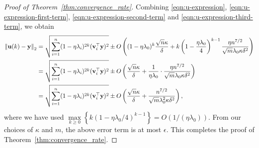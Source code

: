 \begin{proof}[Proof of Theorem~\ref{thm:convergence_rate}]
	Combining \eqref{eqn:u-expression}, \eqref{eqn:u-expression-first-term}, \eqref{eqn:u-expression-second-term} and \eqref{eqn:u-expression-third-term}, we obtain
	\begin{align*}
	\left\|\mathbf{u}(k) - \mathbf{y}\right\|_2
	&= \sqrt{\sum_{i=1}^n (1-\eta\lambda_i)^{2k} (\mathbf{v}_i^\top \mathbf{y})^2} \pm O\left( (1-\eta \lambda_0)^k \frac{ \sqrt n \kappa }{ \delta}  + k \left( 1 - \frac{\eta\lambda_0}{4} \right)^{k-1}    \frac{\eta n^{7/2}}{\sqrt m \lambda_0 \kappa \delta^{2}}\right) \\
	&= \sqrt{\sum_{i=1}^n (1-\eta\lambda_i)^{2k} (\mathbf{v}_i^\top \mathbf{y})^2} \pm O\left(  \frac{ \sqrt n \kappa }{ \delta} + \frac{1}{\eta\lambda_0} \cdot   \frac{\eta n^{7/2}}{\sqrt m \lambda_0 \kappa \delta^{2}}\right)\\
		&= \sqrt{\sum_{i=1}^n (1-\eta\lambda_i)^{2k} (\mathbf{v}_i^\top \mathbf{y})^2} \pm O\left(  \frac{ \sqrt n \kappa }{ \delta} +  \frac{ n^{7/2}}{\sqrt m \lambda_0^2 \kappa \delta^{2}}\right),
	\end{align*}
	where we have used $\max\limits_{k\ge 0} \left\{ k (1-\eta\lambda_0/4)^{k-1} \right\} = O(1/(\eta\lambda_0))$.
	From our choices of $\kappa$ and $m$, the above error term is at most $\epsilon$.
	 This completes the proof of Theorem~\ref{thm:convergence_rate}.
\end{proof}